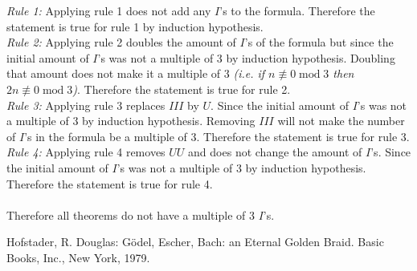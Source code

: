 \documentclass[12pt]{article}
\begin{document}
\begin{itemize}
\textit{Rule 1:}  Applying rule 1 does not add any $I$'s to the formula. Therefore the statement is true for rule 1 by induction hypothesis.\\
\textit{Rule 2:}  Applying rule 2 doubles the amount of $I$'s of the formula but since the initial amount of $I$'s was not a multiple of 3 by induction hypothesis.  Doubling that amount does not make it a multiple of 3 \textit{(i.e. if $n \not\equiv 0 \operatorname{mod} 3$ then $2n \not\equiv 0 \operatorname{mod} 3$)}. Therefore the statement is true for rule 2.\\
\textit{Rule 3:} Applying rule 3 replaces $III$ by $U$.  Since the initial amount of $I$'s was not a multiple of 3 by induction hypothesis. Removing $III$ will not make the number of $I$'s in the formula be a multiple of 3.  Therefore the statement is true for rule 3.\\
\textit{Rule 4:}  Applying rule 4 removes $UU$ and does not change the amount of $I$'s.  Since the initial amount of $I$'s was not a multiple of 3 by induction hypothesis.  Therefore the statement is true for rule 4.\\\\
Therefore all theorems do not have a multiple of 3 $I$'s.
\end{itemize}
\cite{1}
\begin{thebibliography}{1}
 Hofstader, R. Douglas: G\"odel, Escher, Bach: an Eternal Golden Braid. Basic Books, Inc., New York, 1979.
\end{thebibliography}
\end{document}
